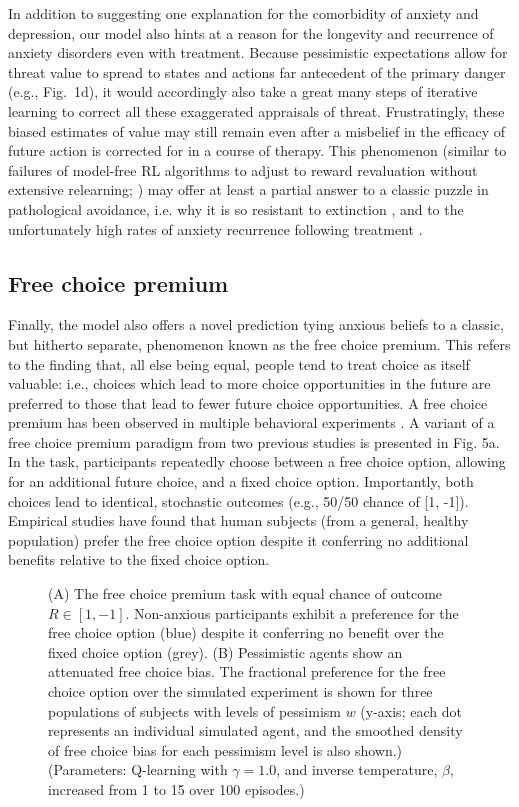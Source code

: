 \documentclass[manuscript]{stjour}
\begin{document}
In addition to suggesting one explanation for the comorbidity of anxiety and depression, our model also hints at a reason for the longevity and recurrence of anxiety disorders even with treatment. Because pessimistic expectations allow for threat value to spread to states and actions far antecedent of the primary danger (e.g., Fig.~1d), it would accordingly also take a great many steps of iterative learning to correct all these exaggerated appraisals of threat. Frustratingly, these biased estimates of value may still remain even after a misbelief in the efficacy of future action is corrected for in a course of therapy. This phenomenon (similar to failures of model-free RL algorithms to adjust to reward revaluation without extensive relearning; \citealp{daw2005}) may offer at least a partial answer to a classic puzzle in pathological avoidance, i.e. why it is so resistant to extinction \citep{moutoussis2018}, and to the unfortunately high rates of anxiety recurrence following treatment \citep{pittig2018}.

\subsection{Free choice premium}

Finally, the model also offers a novel prediction tying anxious beliefs to a classic, but hitherto separate, phenomenon known as the free choice premium. This refers to the finding that, all else being equal, people tend to treat choice as itself valuable: i.e., choices which lead to more choice opportunities in the future are preferred to those that lead to fewer future choice opportunities. A free choice premium has been observed in multiple behavioral experiments \citep{Leotti2010, ly2019}. A variant of a free choice premium paradigm from two previous studies \citep{Leotti2011,Leotti2014} is presented in Fig. 5a. In the task, participants repeatedly choose between a free choice option, allowing for an additional future choice, and a fixed choice option. Importantly, both choices lead to identical, stochastic outcomes (e.g., 50/50 chance of [1, -1]). Empirical studies have found that human subjects (from a general, healthy population) prefer the free choice option despite it conferring no additional benefits relative to the fixed choice option. 

\begin{figure}[!t]
\caption{(A) The free choice premium task \citep{Leotti2011, Leotti2014} with equal chance of outcome $R \in [1, -1]$. Non-anxious participants exhibit a preference for the free choice option (blue) despite it conferring no benefit over the fixed choice option (grey). (B) Pessimistic agents show an attenuated free choice bias. The fractional preference for the free choice option over the simulated experiment is shown for three populations of subjects with levels of pessimism $w$ (y-axis; each dot represents an individual simulated agent, and the smoothed density of free choice bias for each pessimism level is also shown.) (Parameters: Q-learning with $\gamma = 1.0$, and inverse temperature, $\beta$, increased from 1 to 15 over 100 episodes.)}
\label{fig:choice}
\end{figure}
\end{document}
